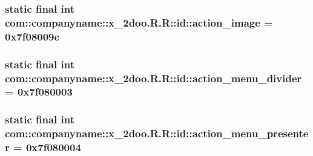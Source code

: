 \hypertarget{classcom_1_1companyname_1_1x__2doo_1_1_r_1_1id_a9f5a99730dc4e2262ce4b8c5ac6117e}{
\subsubsection[{action\_\-image}]{\setlength{\rightskip}{0pt plus 5cm}static final int com::companyname::x\_\-2doo.R.R::id::action\_\-image = 0x7f08009c}}
\label{classcom_1_1companyname_1_1x__2doo_1_1_r_1_1id_a9f5a99730dc4e2262ce4b8c5ac6117e}


\hypertarget{classcom_1_1companyname_1_1x__2doo_1_1_r_1_1id_2d460efcedb79ec1e2d2e98c11130f47}{
\subsubsection[{action\_\-menu\_\-divider}]{\setlength{\rightskip}{0pt plus 5cm}static final int com::companyname::x\_\-2doo.R.R::id::action\_\-menu\_\-divider = 0x7f080003}}
\label{classcom_1_1companyname_1_1x__2doo_1_1_r_1_1id_2d460efcedb79ec1e2d2e98c11130f47}


\hypertarget{classcom_1_1companyname_1_1x__2doo_1_1_r_1_1id_68e8f0af02d80622ae5d48f30b2852e7}{
\subsubsection[{action\_\-menu\_\-presenter}]{\setlength{\rightskip}{0pt plus 5cm}static final int com::companyname::x\_\-2doo.R.R::id::action\_\-menu\_\-presenter = 0x7f080004}}
\label{classcom_1_1companyname_1_1x__2doo_1_1_r_1_1id_68e8f0af02d80622ae5d48f30b2852e7}


